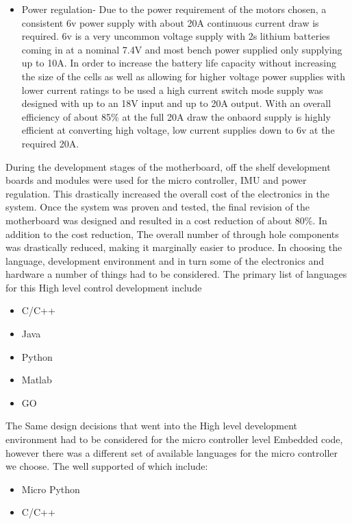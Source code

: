 \documentclass[conference]{IEEEtran}
\begin{document}
\begin{itemize}
        \item Power regulation-
        Due to the power requirement of the motors chosen, a consistent 6v power supply with about 20A continuous current draw is required. 6v is a very uncommon voltage supply with 2s lithium batteries coming in at a nominal 7.4V and most bench power supplied only supplying up to 10A. In order to increase the battery life capacity without increasing the size of the cells as well as allowing for higher voltage power supplies with lower current ratings to be used a high current switch mode supply was designed with up to an 18V input and up to 20A output. With an overall efficiency of about 85\% at the full 20A draw the onbaord supply is highly efficient at converting high voltage, low current supplies down to 6v at the required 20A. \newline
    \end{itemize}
    During the development stages of the motherboard, off the shelf development boards and modules were used for the micro controller, IMU and power regulation. This drastically increased the overall cost of the electronics in the system. Once the system was proven and tested, the final revision of the motherboard was designed and resulted in a cost reduction of about 80\%. In addition to the cost reduction, The overall number of through hole components was drastically reduced, making it marginally easier to produce.
In choosing the language, development environment and in turn some of the electronics and hardware a number of things had to be considered. The primary list of languages for this High level control development include
\begin{itemize}
    \item C/C++
    \item Java
    \item Python
    \item Matlab
    \item GO
\end{itemize}

The Same design decisions that went into the High level development environment had to be considered for the micro controller level Embedded code, however there was a different set of available languages for the micro controller we choose. The well supported of which include:
    \begin{itemize}
        \item Micro Python
        \item C/C++
    \end{itemize}
\end{document}
